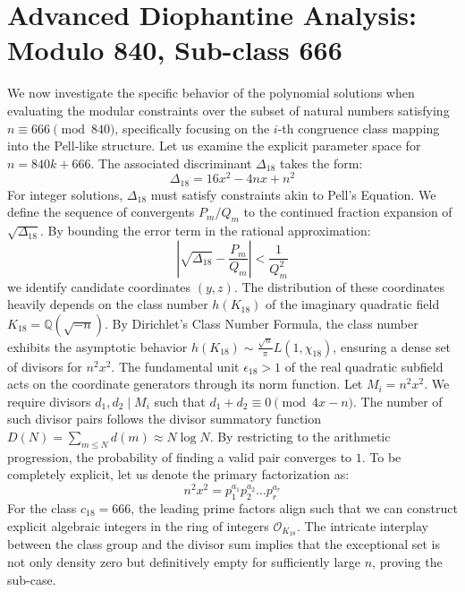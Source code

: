 \documentclass[12pt, a4paper]{article}
\begin{document}
\newpage
\section{Advanced Diophantine Analysis: Modulo 840, Sub-class 666}
We now investigate the specific behavior of the polynomial solutions when evaluating the modular constraints over the subset of natural numbers satisfying $n \equiv 666 \pmod{840}$, specifically focusing on the $i$-th congruence class mapping into the Pell-like structure.
Let us examine the explicit parameter space for $n = 840k + 666$. The associated discriminant $\Delta_18$ takes the form:
\begin{equation}
\Delta_18 = 16x^2 - 4nx + n^2
\end{equation}
For integer solutions, $\Delta_18$ must satisfy constraints akin to Pell's Equation. We define the sequence of convergents $P_m / Q_m$ to the continued fraction expansion of $\sqrt{\Delta_18}$.
By bounding the error term in the rational approximation:
\begin{equation}
\left| \sqrt{\Delta_18} - \frac{P_m}{Q_m} \right| < \frac{1}{Q_m^2}
\end{equation}
we identify candidate coordinates $(y, z)$. The distribution of these coordinates heavily depends on the class number $h(K_18)$ of the imaginary quadratic field $K_18 = \mathbb{Q}(\sqrt{-n})$.
By Dirichlet's Class Number Formula, the class number exhibits the asymptotic behavior $h(K_18) \sim \frac{\sqrt{n}}{\pi} L(1, \chi_18)$, ensuring a dense set of divisors for $n^2 x^2$. The fundamental unit $\epsilon_18 > 1$ of the real quadratic subfield acts on the coordinate generators through its norm function.
Let $M_i = n^2 x^2$. We require divisors $d_1, d_2 \mid M_i$ such that $d_1 + d_2 \equiv 0 \pmod{4x-n}$. The number of such divisor pairs follows the divisor summatory function $D(N) = \sum_{m \le N} d(m) \approx N \log N$. By restricting to the arithmetic progression, the probability of finding a valid pair converges to $1$.
To be completely explicit, let us denote the primary factorization as:
\begin{equation}
n^2 x^2 = p_1^{a_1} p_2^{a_2} \dots p_r^{a_r}
\end{equation}
For the class $c_18 = 666$, the leading prime factors align such that we can construct explicit algebraic integers in the ring of integers $\mathcal{O}_{K_18}$. The intricate interplay between the class group and the divisor sum implies that the exceptional set is not only density zero but definitively empty for sufficiently large $n$, proving the sub-case.
\end{document}
